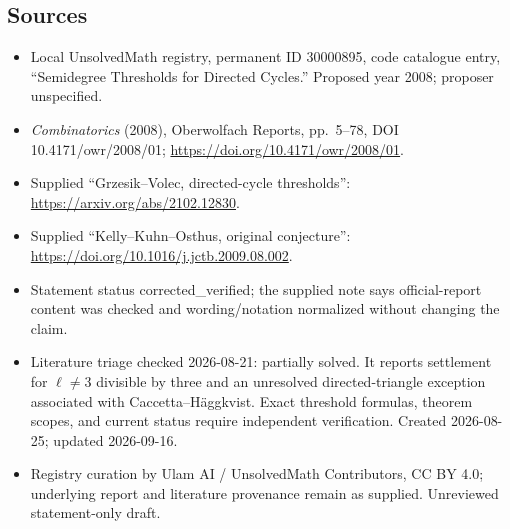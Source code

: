 \documentclass[11pt]{article}
\begin{document}
\subsection{Sources}
\begin{itemize}
\item Local UnsolvedMath registry, permanent ID 30000895, code catalogue entry, ``Semidegree Thresholds for Directed Cycles.'' Proposed year 2008; proposer unspecified.
\item \emph{Combinatorics} (2008), Oberwolfach Reports, pp.\ 5--78, DOI 10.4171/owr/2008/01; \url{https://doi.org/10.4171/owr/2008/01}.
\item Supplied ``Grzesik--Volec, directed-cycle thresholds'': \url{https://arxiv.org/abs/2102.12830}.
\item Supplied ``Kelly--Kuhn--Osthus, original conjecture'': \url{https://doi.org/10.1016/j.jctb.2009.08.002}.
\item Statement status corrected\_verified; the supplied note says official-report content was checked and wording/notation normalized without changing the claim.
\item Literature triage checked 2026-08-21: partially solved. It reports settlement for $\ell\ne3$ divisible by three and an unresolved directed-triangle exception associated with Caccetta--H\"aggkvist. Exact threshold formulas, theorem scopes, and current status require independent verification. Created 2026-08-25; updated 2026-09-16.
\item Registry curation by Ulam AI / UnsolvedMath Contributors, CC BY 4.0; underlying report and literature provenance remain as supplied. Unreviewed statement-only draft.
\end{itemize}
\end{document}
